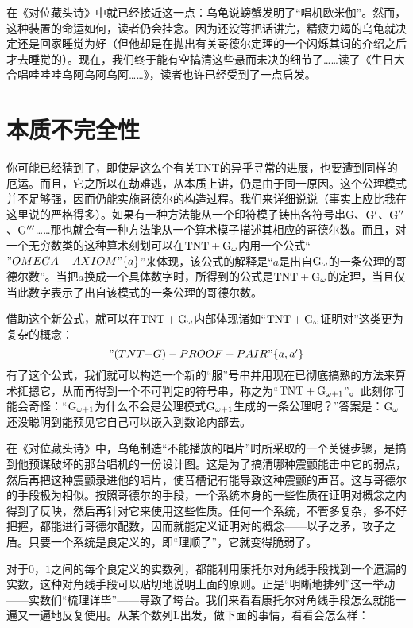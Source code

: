 在《对位藏头诗》中就已经接近这一点：乌龟说螃蟹发明了“唱机欧米伽”。然而，这种装置的命运如何，读者仍会挂念。因为还没等把话讲完，精疲力竭的乌龟就决定还是回家睡觉为好（但他却是在抛出有关哥德尔定理的一个闪烁其词的介绍之后才去睡觉的）。现在，我们终于能有空搞清这些悬而未决的细节了……读了《生日大合唱哇哇哇乌阿乌阿乌阿……》，读者也许已经受到了一点启发。

\section{本质不完全性}

你可能已经猜到了，即使是这么个有关TNT的异乎寻常的进展，也要遭到同样的厄运。而且，它之所以在劫难逃，从本质上讲，仍是由于同一原因。这个公理模式并不足够强，因而仍能实施哥德尔的构造过程。我们来详细说说（事实上应比我在这里说的严格得多）。如果有一种方法能从一个印符模子铸出各符号串G、$\mathrm { G }'$、$\mathrm { G }''$、$\mathrm { G }'''$……那也就会有一种方法能从一个算术模子描述其相应的哥德尔数。而且，对一个无穷数类的这种算术刻划可以在$\mathrm { TNT }+\mathrm { G }_\omega$内用一个公式“$"OMEGA-AXIOM"\{a\}$”来体现，该公式的解释是“$a$是出自$\mathrm { G }_\omega$的一条公理的哥德尔数”。当把$a$换成一个具体数字时，所得到的公式是$\mathrm { TNT }+\mathrm { G }_\omega$的定理，当且仅当此数字表示了出自该模式的一条公理的哥德尔数。

借助这个新公式，就可以在$\mathrm { TNT }+\mathrm { G }_\omega$内部体现诸如“$\mathrm { TNT }+\mathrm { G }_\omega$证明对”这类更为复杂的概念：
\[
"(TNT${}+{}$G)-PROOF-PAIR"\{a, a'\}
\]
有了这个公式，我们就可以构造一个新的“服”号串并用现在已彻底搞熟的方法来算术㧟摁它，从而再得到一个不可判定的符号串，称之为“$\mathrm { TNT }+\mathrm { G }_{\omega+1}$”。此刻你可能会奇怪：“$\mathrm { G }_{\omega+1}$为什么不会是公理模式$\mathrm { G }_{\omega+1}$生成的一条公理呢？”答案是：$\mathrm { G }_\omega$还没聪明到能预见它自己可以嵌入到数论内部去。

在《对位藏头诗》中，乌龟制造“不能播放的唱片”时所采取的一个关键步骤，是搞到他预谋破坏的那台唱机的一份设计图。这是为了搞清哪种震颤能击中它的弱点，然后再把这种震颤录进他的唱片，使音槽记有能导致这种震颤的声音。这与哥德尔的手段极为相似。按照哥德尔的手段，一个系统本身的一些性质在证明对概念之内得到了反映，然后再针对它来使用这些性质。任何一个系统，不管多复杂，多不好把握，都能进行哥德尔配数，因而就能定义证明对的概念——以子之矛，攻子之盾。只要一个系统是良定义的，即“理顺了”，它就变得脆弱了。

对于$0$，$1$之间的每个良定义的实数列，都能利用康托尔对角线手段找到一个遗漏的实数，这种对角线手段可以贴切地说明上面的原则。正是“明晰地排列”这一举动——实数们“梳理详毕”——导致了垮台。我们来看看康托尔对角线手段怎么就能一遍又一遍地反复使用。从某个数列L出发，做下面的事情，看看会怎么样：

